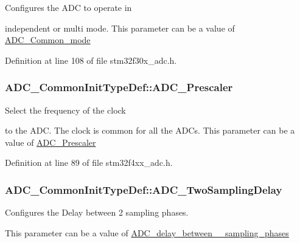 \begin{DoxyVerb}                      Configures the ADC to operate in 
\end{DoxyVerb}
 independent or multi mode. This parameter can be a value of \hyperlink{group___a_d_c___common__mode}{A\-D\-C\-\_\-\-Common\-\_\-mode} 

Definition at line 108 of file stm32f30x\-\_\-adc.\-h.

\hypertarget{struct_a_d_c___common_init_type_def_a4b968331be8f4a43ef31c18f4422df4b}{
\subsubsection[{A\-D\-C\-\_\-\-Prescaler}]{ A\-D\-C\-\_\-\-Common\-Init\-Type\-Def\-::\-A\-D\-C\-\_\-\-Prescaler}}\label{struct_a_d_c___common_init_type_def_a4b968331be8f4a43ef31c18f4422df4b}
\begin{DoxyVerb}                 Select the frequency of the clock 
\end{DoxyVerb}
 to the A\-D\-C. The clock is common for all the A\-D\-Cs. This parameter can be a value of \hyperlink{group___a_d_c___prescaler}{A\-D\-C\-\_\-\-Prescaler} 

Definition at line 89 of file stm32f4xx\-\_\-adc.\-h.

\hypertarget{struct_a_d_c___common_init_type_def_a2828abd59ed1777ae66c642d89be410e}{
\subsubsection[{A\-D\-C\-\_\-\-Two\-Sampling\-Delay}]{ A\-D\-C\-\_\-\-Common\-Init\-Type\-Def\-::\-A\-D\-C\-\_\-\-Two\-Sampling\-Delay}}\label{struct_a_d_c___common_init_type_def_a2828abd59ed1777ae66c642d89be410e}
\begin{DoxyVerb}          Configures the Delay between 2 sampling phases.
\end{DoxyVerb}
 This parameter can be a value of \hyperlink{group___a_d_c__delay__between__2__sampling__phases}{A\-D\-C\-\_\-delay\-\_\-between\-\_\-\_\-sampling\-\_\-phases} 

